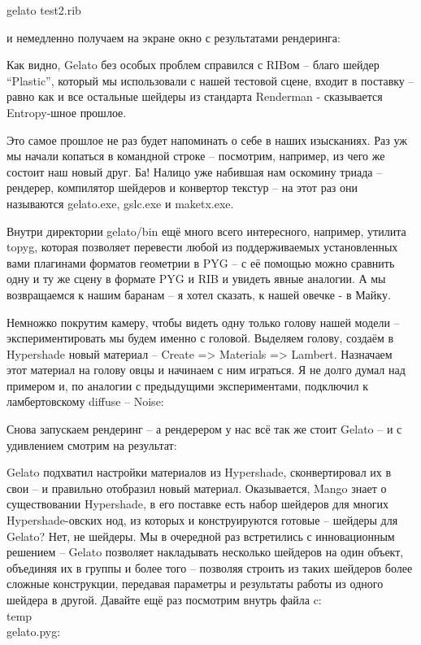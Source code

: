gelato test2.rib
  

 и немедленно получаем на экране окно с результатами
    рендеринга:
  

  

 Как видно, Gelato без особых проблем справился с
    RIBом – благо шейдер “Plastic”, который мы использовали с нашей
    тестовой сцене, входит в поставку – равно как и все остальные
    шейдеры из стандарта Renderman - сказывается Entropy-шное
    прошлое.
  

 Это самое прошлое не раз будет напоминать о себе в
    наших изысканиях. Раз уж мы начали копаться в командной строке –
    посмотрим, например, из чего же состоит наш новый друг. Ба! Налицо
    уже набившая нам оскомину триада – рендерер, компилятор шейдеров и
    конвертор текстур – на этот раз они называются gelato.exe, gslc.exe
    и maketx.exe.
  

 Внутри директории gelato/bin ещё много всего
    интересного, например, утилита topyg, которая позволяет перевести
    любой из поддерживаемых установленных вами плагинами форматов
    геометрии в PYG – с её помощью можно сравнить одну и ту же сцену в
    формате PYG и RIB и увидеть явные аналогии. А мы возвращаемся к
    нашим баранам – я хотел сказать, к нашей овечке - в
    Майку.
  

 Немножко покрутим камеру, чтобы видеть одну только
    голову нашей модели – экспериментировать мы будем именно с головой.
    Выделяем голову, создаём в Hypershade новый материал – Create =>
    Materials => Lambert. Назначаем этот материал на голову овцы и
    начинаем с ним играться. Я не долго думал над примером и, по
    аналогии с предыдущими экспериментами, подключил к ламбертовскому
    diffuse – Noise:
  

  

 Снова запускаем рендеринг – а рендерером у нас всё
    так же стоит Gelato – и с удивлением смотрим на
    результат:
  

  

 Gelato подхватил настройки материалов из
    Hypershade, сконвертировал их в свои – и правильно отобразил новый
    материал. Оказывается, Mango знает о существовании Hypershade, в
    его поставке есть набор шейдеров для многих Hypershade-овских нод,
    из которых и конструируются готовые – шейдеры для Gelato? Нет, не
    шейдеры. Мы в очередной раз встретились с инновационным решением –
    Gelato позволяет накладывать несколько шейдеров на один объект,
    объединяя их в группы и более того – позволяя строить из таких
    шейдеров более сложные конструкции, передавая параметры и
    результаты работы из одного шейдера в другой. Давайте ещё раз
    посмотрим внутрь файла c:\\temp\\gelato.pyg:
  
